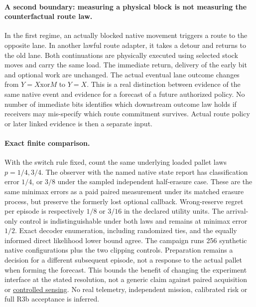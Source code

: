 \documentclass{article}
\begin{document}
\paragraph{A second boundary: measuring a physical block is not measuring
the counterfactual route law.}
In the first regime, an actually blocked native movement triggers a
route to the opposite lane. In another lawful route adapter, it
takes a detour and returns to the old lane. Both continuations are
physically executed using selected stock moves and carry the same
load. The immediate return, delivery of the early bit and
optional work are unchanged. The actual eventual lane outcome
changes from $Y=X\mathbin{\mathrm{xor}} M$ to $Y=X$.
This is a real distinction between evidence of the same native
event and evidence for a forecast of a future authorized policy.
No number of immediate bits identifies which downstream outcome
law holds if receivers may mis-specify which route commitment
survives. Actual route policy or later linked evidence is then
a separate input.

\paragraph{Exact finite comparison.}
With the switch rule fixed, count the same underlying loaded
pallet laws $p=1/4,3/4$. The observer with the named native state
report has classification error $1/4$, or $3/8$ under the sampled
independent half-erasure case. These are the same minimax errors
as a paid paired measurement under its matched erasure process,
but preserve the formerly lost optional callback. Wrong-reserve
regret per episode is respectively $1/8$ or $3/16$ in the
declared utility units. The arrival-only control is
indistinguishable under both laws and remains at minimax
error $1/2$. Exact decoder enumeration, including randomized ties,
and the equally informed direct likelihood lower bound agree.
The campaign runs 256 synthetic native configurations plus
the two clipping controls. Preparation remains a decision for a
different subsequent episode, not a response to the actual pallet
when forming the forecast. This bounds the benefit of changing
the experiment interface at the stated resolution, not a generic
claim against paired acquisition or
\href{https://arxiv.org/abs/1205.0858}{controlled sensing}.
No real telemetry, independent mission, calibrated risk or
full R3b acceptance is inferred.
\end{document}
